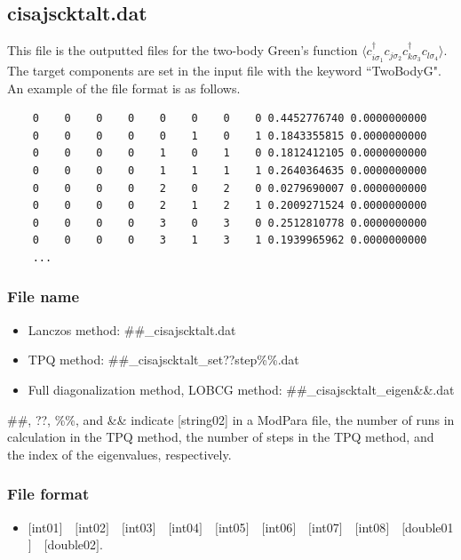 \newpage
\subsection{cisajscktalt.dat}
\label{Subsec:cisajscktalt}
This file is the outputted files for the two-body Green's function $\langle c_{i\sigma_1}^{\dagger}c_{j\sigma_2}c_{k\sigma_3}^{\dagger}c_{l\sigma_4}\rangle$. 
The target components are set in the input file with the keyword ``TwoBodyG".
An example of the file format is as follows.

\begin{minipage}{15cm}
\begin{screen}
\begin{verbatim}
    0    0    0    0    0    0    0    0 0.4452776740 0.0000000000
    0    0    0    0    0    1    0    1 0.1843355815 0.0000000000
    0    0    0    0    1    0    1    0 0.1812412105 0.0000000000
    0    0    0    0    1    1    1    1 0.2640364635 0.0000000000
    0    0    0    0    2    0    2    0 0.0279690007 0.0000000000
    0    0    0    0    2    1    2    1 0.2009271524 0.0000000000
    0    0    0    0    3    0    3    0 0.2512810778 0.0000000000
    0    0    0    0    3    1    3    1 0.1939965962 0.0000000000
    ...
\end{verbatim}
\end{screen}
\end{minipage}

\subsubsection{File name}
 \begin{itemize}
   \item{Lanczos method:}  \#\#\_cisajscktalt.dat
   \item{TPQ method:} \#\#\_cisajscktalt\_set??step\%\%.dat
   \item{Full diagonalization method, LOBCG method:}  \#\#\_cisajscktalt\_eigen{\&\&}.dat
  \end{itemize}
  \#\#, ??, \%\%, and \&\& indicate [string02] in a ModPara file, the number of runs in calculation in the TPQ method, the number of steps in the TPQ method, and the index of the eigenvalues, respectively.


\subsubsection{File format}
 \begin{itemize}
   \item  $[$int01$]$~~$[$int02$]$~~$[$int03$]$~~$[$int04$]$~~$[$int05$]$~~$[$int06$]$~~$[$int07$]$~~$[$int08$]$~~$[$double01$]$~~$[$double02$]$.
  \end{itemize}


